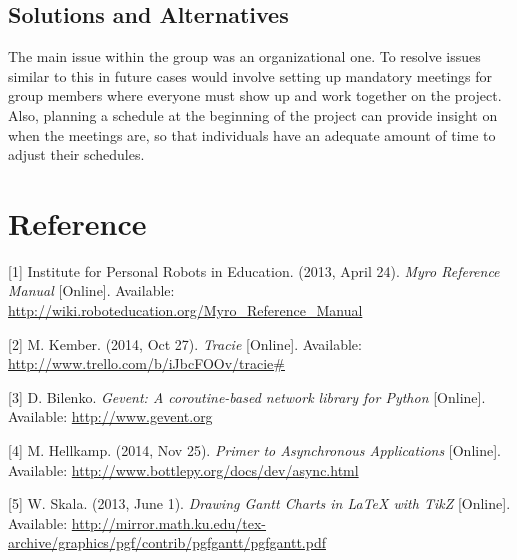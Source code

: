 \documentclass[11pt, letterpaper]{article}
\begin{document}
		\subsection{Solutions and Alternatives}
			The main issue within the group was an organizational one. To resolve issues similar to this in future cases would involve setting up mandatory meetings for group members where everyone must show up and work together on the project. Also, planning a schedule at the beginning of the project can provide insight on when the meetings are, so that individuals have an adequate amount of time to adjust their schedules.


	\newpage
	\section{Reference}
	[1]  Institute for Personal Robots in Education. (2013, April 24). \textit{Myro Reference Manual} [Online]. Available: \url{http://wiki.roboteducation.org/Myro_Reference_Manual}

	[2] M. Kember. (2014, Oct 27). \textit{Tracie} [Online]. Available: \url{http://www.trello.com/b/iJbcFOOv/tracie#}

	[3] D. Bilenko. \textit{Gevent: A coroutine-based network library for Python} [Online]. Available: \url{http://www.gevent.org}

	[4] M. Hellkamp. (2014, Nov 25). \textit{Primer to Asynchronous Applications} [Online]. Available: \url{http://www.bottlepy.org/docs/dev/async.html}

	[5] W. Skala. (2013, June 1). \textit{Drawing Gantt Charts in LaTeX with TikZ} [Online]. Available: \url{http://mirror.math.ku.edu/tex-archive/graphics/pgf/contrib/pgfgantt/pgfgantt.pdf}
\end{document}
